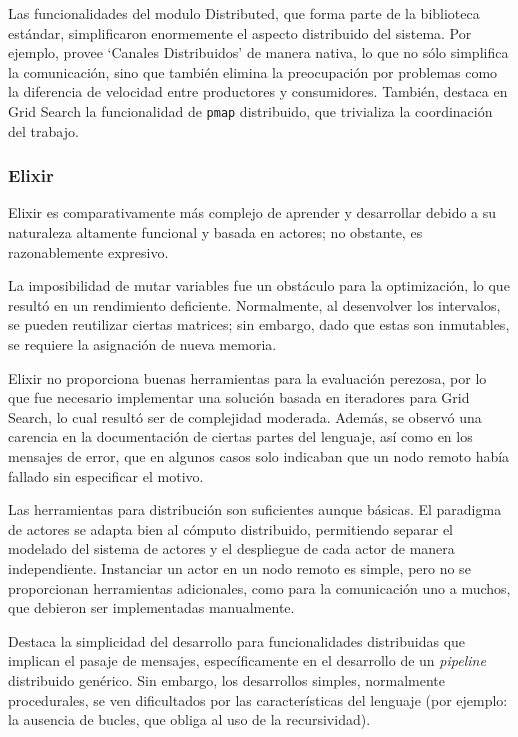 \documentclass[11pt]{article}
\let\Oldsubsubsection\subsubsection
\renewcommand{\subsubsection}{\FloatBarrier\Oldsubsubsection}
\begin{document}
Las funcionalidades del modulo Distributed, que forma parte de la biblioteca estándar, simplificaron enormemente el aspecto distribuido del sistema. Por ejemplo, provee ‘Canales Distribuidos’ de manera nativa, lo que no sólo simplifica la comunicación, sino que también elimina la preocupación por problemas como la diferencia de velocidad entre productores y consumidores. También, destaca en Grid Search la funcionalidad de \lstinline{pmap} distribuido, que trivializa la coordinación del trabajo.

\subsubsection{Elixir}

Elixir es comparativamente más complejo de aprender y desarrollar debido a su naturaleza altamente funcional y basada en actores; no obstante, es razonablemente expresivo.

La imposibilidad de mutar variables fue un obstáculo para la optimización, lo que resultó en un rendimiento deficiente. Normalmente, al desenvolver los intervalos, se pueden reutilizar ciertas matrices; sin embargo, dado que estas son inmutables, se requiere la asignación de nueva memoria.

Elixir no proporciona buenas herramientas para la evaluación perezosa, por lo que fue necesario implementar una solución basada en iteradores para Grid Search, lo cual resultó ser de complejidad moderada. Además, se observó una carencia en la documentación de ciertas partes del lenguaje, así como en los mensajes de error, que en algunos casos solo indicaban que un nodo remoto había fallado sin especificar el motivo.

Las herramientas para distribución son suficientes aunque básicas. El paradigma de actores se adapta bien al cómputo distribuido, permitiendo separar el modelado del sistema de actores y el despliegue de cada actor de manera independiente. Instanciar un actor en un nodo remoto es simple, pero no se proporcionan herramientas adicionales, como para la comunicación uno a muchos, que debieron ser implementadas manualmente.

Destaca la simplicidad del desarrollo para funcionalidades distribuidas que implican el pasaje de mensajes, específicamente en el desarrollo de un \textit{pipeline} distribuido genérico. Sin embargo, los desarrollos simples, normalmente procedurales, se ven dificultados por las características del lenguaje (por ejemplo: la ausencia de bucles, que obliga al uso de la recursividad).
\end{document}

